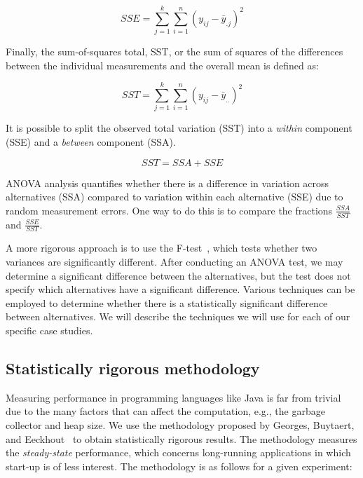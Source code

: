 \begin{equation}
    SSE = \sum_{j = 1}^{k}\sum_{i = 1}^{n} (y_{ij} - \bar{y}_{.j})^2
\end{equation}

Finally, the sum-of-squares total, SST, or the sum of squares of the differences between the individual measurements and the overall mean is defined as:

\begin{equation}
    SST = \sum_{j = 1}^{k}\sum_{i = 1}^{n} (y_{ij} - \bar{y}_{..})^2
\end{equation}

It is possible to split the observed total variation (SST) into a \emph{within} component (SSE) and a \emph{between} component (SSA).

\begin{equation}
    SST = SSA + SSE
\end{equation}

ANOVA analysis quantifies whether there is a difference in variation across alternatives (SSA) compared to variation within each alternative (SSE) due to random measurement errors. One way to do this is to compare the fractions \(\frac{SSA}{SST}\) and \(\frac{SSE}{SST}\).


A more rigorous approach is to use the F-test~\cite{lilja2005measuring}, which tests whether two variances are significantly different.  After conducting an ANOVA test, we may determine a significant difference between the alternatives, but the test does not specify which alternatives have a significant difference. Various techniques can be employed to determine whether there is a statistically significant difference between alternatives. We will describe the techniques we will use for each of our specific case studies.

\subsection{\label{subsec:stat-rigor-meth}Statistically rigorous methodology}

Measuring performance in programming languages like Java is far from trivial due to the many factors that can affect the computation, e.g., the garbage collector and heap size. We use the methodology proposed by Georges, Buytaert, and Eeckhout~\cite{DBLP_conf_oopsla_GeorgesBE07} to obtain statistically rigorous results. The methodology measures the \textit{steady-state} performance, which concerns long-running applications in which start-up is of less interest. The methodology is as follows for a given experiment:


